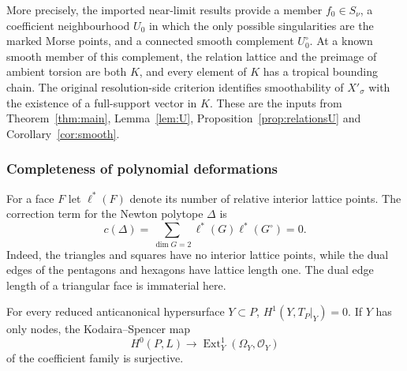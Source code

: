 More precisely, the imported near-limit results provide a member
$f_0\in S_\nu$, a coefficient neighbourhood $U_0$ in which the only
possible singularities are the marked Morse points, and a connected
smooth complement $U_0^\circ$. At a known smooth member of this
complement, the relation lattice and the preimage of ambient torsion
are both $K$, and every element of $K$ has a tropical bounding chain.
The original resolution-side criterion identifies smoothability of
$X'_\sigma$ with the existence of a full-support vector in $K$.
These are the inputs from Theorem~\ref{thm:main}, Lemma~\ref{lem:U},
Proposition~\ref{prop:relationsU} and Corollary~\ref{cor:smooth}.

\subsubsection*{Completeness of polynomial deformations}

For a face $F$ let $\ell^*(F)$ denote its number of relative interior
lattice points. The correction term for the Newton polytope $\Delta$ is
\begin{equation}\label{eq:component-correction}
 c(\Delta)=\sum_{\dim G=2}\ell^*(G)\ell^*(G^\circ)=0.
\end{equation}
Indeed, the triangles and squares have no interior lattice points, while
the dual edges of the pentagons and hexagons have lattice length one.
The dual edge length of a triangular face is immaterial here.

\begin{lemma}\label{lem:component-complete}
For every reduced anticanonical hypersurface $Y\subset P$,
$H^1(Y,T_P|_Y)=0$. If $Y$ has only nodes, the Kodaira--Spencer map
\[
 H^0(P,L)\longrightarrow\operatorname{Ext}^1_Y(\Omega_Y,\mathcal O_Y)
\]
of the coefficient family is surjective.
\end{lemma}

